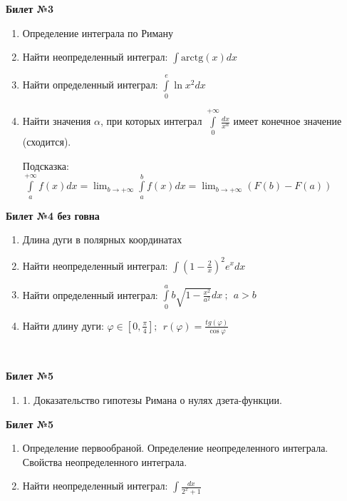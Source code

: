 \documentclass[a4paper, 12pt]{article}
\begin{document}
\begin{center}
	\textbf{Билет №3}
\end{center}
\begin{enumerate}
	\item Определение интеграла по Риману
	\item Найти неопределенный интеграл: $\displaystyle \int{\text{arctg}(x)dx}$
	\item Найти определенный интеграл: $\displaystyle \int\limits_{0}^{e}{\ln{x^2}dx}$
	\item Найти значения $\alpha$, при которых интеграл $\displaystyle \int\limits_{0}^{+\infty}{\frac{dx}{x^{\alpha}}}$ имеет конечное значение (сходится).
	
	Подсказка: $\displaystyle \int\limits_{a}^{+\infty}{f(x)dx} = \lim_{b\to+\infty}{\int\limits_{a}^{b}{f(x)dx}} = \lim_{b\to+\infty}{\left(F(b) - F(a)\right)} $
	
\end{enumerate}
\newpage
\begin{center}
	\textbf{Билет №4 без говна}
\end{center}
\begin{enumerate}
	\item Длина дуги в полярных координатах
	\item Найти неопределенный интеграл: $\displaystyle \int{\left(1-\frac{2}{x}\right)^2 e^xdx}$
	\item Найти определенный интеграл: $\displaystyle \int\limits_{0}^{a}{b\sqrt{1 - \frac{x^2}{a^2}}dx} \ ; \ \ a > b$
	\item Найти длину дуги: $\displaystyle \varphi \in \left[0, \frac{\pi}{4}\right];\ \  r(\varphi) = \displaystyle \frac{tg(\varphi)}{\cos{\varphi}}$
	
\end{enumerate}
\ \
\begin{center}
	\textbf{Билет №5}
\end{center}
\begin{enumerate}
	\item 1. Доказательство гипотезы Римана о нулях дзета-функции.	
\end{enumerate}

\begin{center}
	\textbf{Билет №5}
\end{center}
\begin{enumerate}
	\item Определение первообраной. Определение неопределенного интеграла. Свойства неопределенного интеграла.
	\item Найти неопределенный интеграл: $\displaystyle \int{\frac{dx}{2^x + 1}}$
\end{enumerate}
\end{document}
